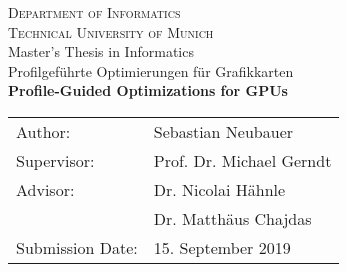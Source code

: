 \newpage
\begin{center}
  \vspace*{3cm}

  \vspace*{0.5cm}
  {\huge \textsc{Department of Informatics}}\\
  \vspace{0.25cm}
  {\Large \textsc{Technical University of Munich}} \\
  \vspace*{2cm}
  {\large Master's Thesis in Informatics} \\
  \vspace*{1cm}
  {\huge Profilgeführte Optimierungen für Grafikkarten} \\
  \vspace*{1cm}
  {\huge \textbf{Profile-Guided Optimizations for GPUs} \\}
  \vspace*{2.5cm}
  {\large
  \begin{tabular}{ll}
  Author:         & Sebastian Neubauer \\
  Supervisor:     & Prof. Dr. Michael Gerndt\\
  Advisor:        & Dr. Nicolai Hähnle\\
                  & Dr. Matthäus Chajdas\\
  Submission Date:& 15. September 2019
  \end{tabular}
  }
\end{center}
